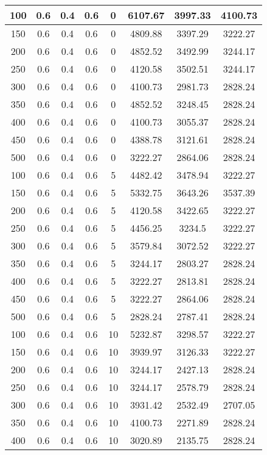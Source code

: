 \documentclass[a4paper, 12pt]{extreport}
\begin{document}
\begin{itemize}
\begin{longtable}{|c|c|c|c|c|c|c|c|}
			100 & 0.6 & 0.4 & 0.6 & 0 & 6107.67 & 3997.33 & 4100.73 \\\hline
			150 & 0.6 & 0.4 & 0.6 & 0 & 4809.88 & 3397.29 & 3222.27 \\\hline
			200 & 0.6 & 0.4 & 0.6 & 0 & 4852.52 & 3492.99 & 3244.17 \\\hline
			250 & 0.6 & 0.4 & 0.6 & 0 & 4120.58 & 3502.51 & 3244.17 \\\hline
			300 & 0.6 & 0.4 & 0.6 & 0 & 4100.73 & 2981.73 & 2828.24 \\\hline
			350 & 0.6 & 0.4 & 0.6 & 0 & 4852.52 & 3248.45 & 2828.24 \\\hline
			400 & 0.6 & 0.4 & 0.6 & 0 & 4100.73 & 3055.37 & 2828.24 \\\hline
			450 & 0.6 & 0.4 & 0.6 & 0 & 4388.78 & 3121.61 & 2828.24 \\\hline
			500 & 0.6 & 0.4 & 0.6 & 0 & 3222.27 & 2864.06 & 2828.24 \\\hline
			100 & 0.6 & 0.4 & 0.6 & 5 & 4482.42 & 3478.94 & 3222.27 \\\hline
			150 & 0.6 & 0.4 & 0.6 & 5 & 5332.75 & 3643.26 & 3537.39 \\\hline
			200 & 0.6 & 0.4 & 0.6 & 5 & 4120.58 & 3422.65 & 3222.27 \\\hline
			250 & 0.6 & 0.4 & 0.6 & 5 & 4456.25 & 3234.5 & 3222.27 \\\hline
			300 & 0.6 & 0.4 & 0.6 & 5 & 3579.84 & 3072.52 & 3222.27 \\\hline
			350 & 0.6 & 0.4 & 0.6 & 5 & 3244.17 & 2803.27 & 2828.24 \\\hline
			400 & 0.6 & 0.4 & 0.6 & 5 & 3222.27 & 2813.81 & 2828.24 \\\hline
			450 & 0.6 & 0.4 & 0.6 & 5 & 3222.27 & 2864.06 & 2828.24 \\\hline
			500 & 0.6 & 0.4 & 0.6 & 5 & 2828.24 & 2787.41 & 2828.24 \\\hline
			100 & 0.6 & 0.4 & 0.6 & 10 & 5232.87 & 3298.57 & 3222.27 \\\hline
			150 & 0.6 & 0.4 & 0.6 & 10 & 3939.97 & 3126.33 & 3222.27 \\\hline
			200 & 0.6 & 0.4 & 0.6 & 10 & 3244.17 & 2427.13 & 2828.24 \\\hline
			250 & 0.6 & 0.4 & 0.6 & 10 & 3244.17 & 2578.79 & 2828.24 \\\hline
			300 & 0.6 & 0.4 & 0.6 & 10 & 3931.42 & 2532.49 & 2707.05 \\\hline
			350 & 0.6 & 0.4 & 0.6 & 10 & 4100.73 & 2271.89 & 2828.24 \\\hline
			400 & 0.6 & 0.4 & 0.6 & 10 & 3020.89 & 2135.75 & 2828.24 \\\hline

\end{longtable}
\end{itemize}
\end{document}
